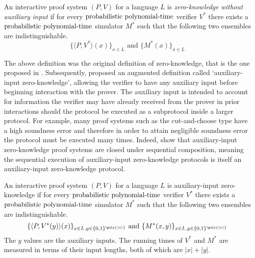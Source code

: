 \begin{definition}
    An interactive proof system $(P,V)$ for a language $L$ is \emph{zero-knowledge without auxiliary input} if for every $\text{probabilistic polynomial-time}$ verifier $V^*$ there exists a $\text{probabilistic polynomial-time}$ simulator $M^*$ such that the following two ensembles are indistinguishable.
    \begin{equation}
        \{ \langle P, V^* \rangle(x) \}_{x\in L}
        \text{ and }
        \{ M^*(x) \}_{x\in L}
    \end{equation}
\end{definition}

The above definition was the original definition of zero-knowledge, that is the one proposed in \cite{GMR85}.
Subsequently, \cite{GO90} proposed an augmented definition called `auxiliary-input zero-knowledge', allowing the verifier to have any auxiliary input before beginning interaction with the prover.
The auxiliary input is intended to account for information the verifier may have already received from the prover in prior interactions should the protocol be executed as a subprotocol inside a larger protocol.
For example, many proof systems such as the cut-and-choose type have a high soundness error and therefore in order to attain negligible soundness error the protocol must be executed many times.
Indeed, \cite{GO90} show that auxiliary-input zero-knowledge proof systems are closed under sequential composition, meaning the sequential execution of auxiliary-input zero-knowledge protocols is itself an auxiliary-input zero-knowledge protocol.

\begin{definition}
    An interactive proof system $(P,V)$ for a language $L$ is auxiliary-input zero-knowledge if for every $\text{probabilistic polynomial-time}$ verifier $V^*$ there exists a $\text{probabilistic polynomial-time}$ simulator $M^*$ such that the following two ensembles are indistinguishable.
    \begin{equation}
        \{ \langle P, V^*(y) \rangle(x) \}_{x\in L, y\in\{0,1\}^{\poly{|x|}}}
        \text{ and }
        \{ M^*(x,y) \}_{x\in L, y\in\{0,1\}^{\poly{|x|}}}
    \end{equation}
    The $y$ values are the auxiliary inputs.
    The running times of $V^*$ and $M^*$ are measured in terms of their input lengths, both of which are $|x|+|y|$.
\end{definition}

